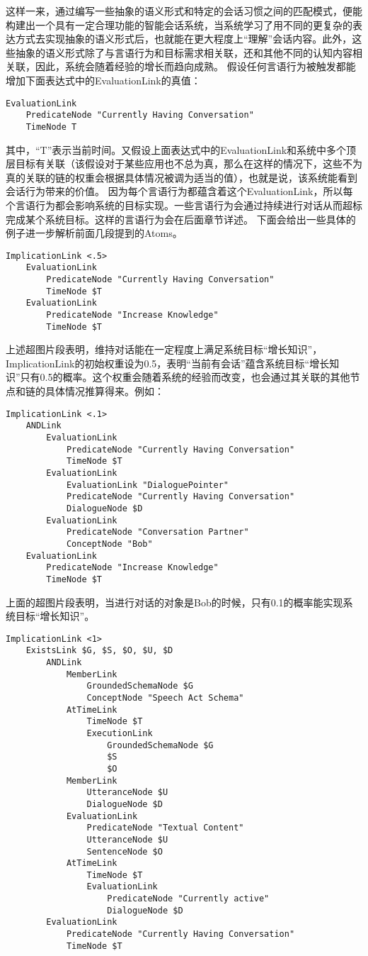 这样一来，通过编写一些抽象的语义形式和特定的会话习惯之间的匹配模式，便能构建出一个具有一定合理功能的智能会话系统，当系统学习了用不同的更复杂的表达方式去实现抽象的语义形式后，也就能在更大程度上“理解”会话内容。此外，这些抽象的语义形式除了与言语行为和目标需求相关联，还和其他不同的认知内容相关联，因此，系统会随着经验的增长而趋向成熟。
假设任何言语行为被触发都能增加下面表达式中的EvaluationLink的真值：
 \begin{verbatim}
EvaluationLink
	PredicateNode "Currently Having Conversation"
	TimeNode T
\end{verbatim}
    其中，“T”表示当前时间。又假设上面表达式中的EvaluationLink和系统中多个顶层目标有关联（该假设对于某些应用也不总为真，那么在这样的情况下，这些不为真的关联的链的权重会根据具体情况被调为适当的值），也就是说，该系统能看到会话行为带来的价值。 因为每个言语行为都蕴含着这个EvaluationLink，所以每个言语行为都会影响系统的目标实现。一些言语行为会通过持续进行对话从而超标完成某个系统目标。这样的言语行为会在后面章节详述。
    下面会给出一些具体的例子进一步解析前面几段提到的Atoms。
 \begin{verbatim}
ImplicationLink <.5>
	EvaluationLink
		PredicateNode "Currently Having Conversation"
		TimeNode $T
	EvaluationLink
		PredicateNode "Increase Knowledge"
		TimeNode $T
\end{verbatim}
上述超图片段表明，维持对话能在一定程度上满足系统目标“增长知识”，ImplicationLink的初始权重设为0.5，表明“当前有会话”蕴含系统目标“增长知识”只有0.5的概率。这个权重会随着系统的经验而改变，也会通过其关联的其他节点和链的具体情况推算得来。例如：
 \begin{verbatim}
ImplicationLink <.1>
	ANDLink
		EvaluationLink
			PredicateNode "Currently Having Conversation"
			TimeNode $T
		EvaluationLink
			EvaluationLink "DialoguePointer"
			PredicateNode "Currently Having Conversation"
			DialogueNode $D
		EvaluationLink
			PredicateNode "Conversation Partner"
			ConceptNode "Bob"		
	EvaluationLink
		PredicateNode "Increase Knowledge"
		TimeNode $T
\end{verbatim}

上面的超图片段表明，当进行对话的对象是Bob的时候，只有0.1的概率能实现系统目标“增长知识”。
\begin{verbatim}
ImplicationLink <1>
	ExistsLink $G, $S, $O, $U, $D
		ANDLink
			MemberLink
				GroundedSchemaNode $G
				ConceptNode "Speech Act Schema"
			AtTimeLink
				TimeNode $T
				ExecutionLink
					GroundedSchemaNode $G
					$S
					$O
			MemberLink
				UtteranceNode $U
				DialogueNode $D
			EvaluationLink
				PredicateNode "Textual Content"
				UtteranceNode $U
				SentenceNode $O
			AtTimeLink
				TimeNode $T
				EvaluationLink
					PredicateNode "Currently active"
					DialogueNode $D			
		EvaluationLink
			PredicateNode "Currently Having Conversation"
			TimeNode $T
\end{verbatim}

